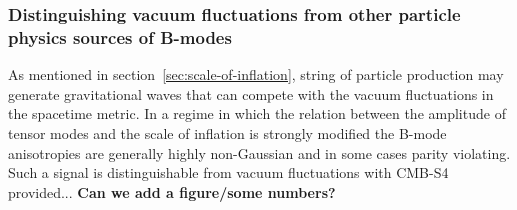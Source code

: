 
\subsubsection{Distinguishing vacuum fluctuations from other particle physics sources of B-modes}

As mentioned in section~\ref{sec:scale-of-inflation}, string of particle production may generate gravitational waves that can compete with the vacuum fluctuations in the spacetime metric. In a regime in which the relation between the amplitude of tensor modes and the scale of inflation is strongly modified the B-mode anisotropies are generally highly non-Gaussian and in some cases parity violating. Such a signal is distinguishable from vacuum fluctuations with CMB-S4 provided... {\bf Can we add a figure/some numbers?}\\

